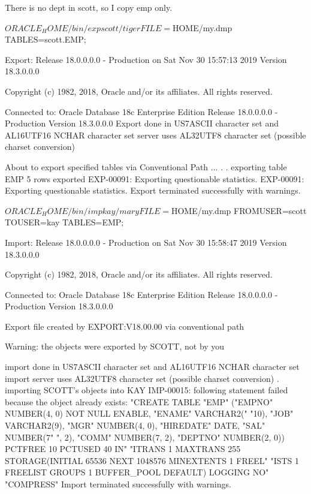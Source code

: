 \documentclass{article}
\begin{document}
There is no dept in scott, so I copy emp only.
\begin{commandshell}
$ORACLE_HOME/bin/exp scott/tiger FILE=$HOME/my.dmp TABLES=scott.EMP;
\end{commandshell}
\begin{messageshell}

Export: Release 18.0.0.0.0 - Production on Sat Nov 30 15:57:13 2019
Version 18.3.0.0.0

Copyright (c) 1982, 2018, Oracle and/or its affiliates.  All rights reserved.


Connected to: Oracle Database 18c Enterprise Edition Release 18.0.0.0.0 - Production
Version 18.3.0.0.0
Export done in US7ASCII character set and AL16UTF16 NCHAR character set
server uses AL32UTF8 character set (possible charset conversion)

About to export specified tables via Conventional Path ...
. . exporting table                            EMP          5 rows exported
EXP-00091: Exporting questionable statistics.
EXP-00091: Exporting questionable statistics.
Export terminated successfully with warnings.
\end{messageshell}
\begin{commandshell}
$ORACLE_HOME/bin/imp kay/mary FILE=$HOME/my.dmp  FROMUSER=scott TOUSER=kay TABLES=EMP;
\end{commandshell}
\begin{messageshell}

Import: Release 18.0.0.0.0 - Production on Sat Nov 30 15:58:47 2019
Version 18.3.0.0.0

Copyright (c) 1982, 2018, Oracle and/or its affiliates.  All rights reserved.


Connected to: Oracle Database 18c Enterprise Edition Release 18.0.0.0.0 - Production
Version 18.3.0.0.0

Export file created by EXPORT:V18.00.00 via conventional path

Warning: the objects were exported by SCOTT, not by you

import done in US7ASCII character set and AL16UTF16 NCHAR character set
import server uses AL32UTF8 character set (possible charset conversion)
. importing SCOTT's objects into KAY
IMP-00015: following statement failed because the object already exists:
 "CREATE TABLE "EMP" ("EMPNO" NUMBER(4, 0) NOT NULL ENABLE, "ENAME" VARCHAR2("
 "10), "JOB" VARCHAR2(9), "MGR" NUMBER(4, 0), "HIREDATE" DATE, "SAL" NUMBER(7"
 ", 2), "COMM" NUMBER(7, 2), "DEPTNO" NUMBER(2, 0))  PCTFREE 10 PCTUSED 40 IN"
 "ITRANS 1 MAXTRANS 255 STORAGE(INITIAL 65536 NEXT 1048576 MINEXTENTS 1 FREEL"
 "ISTS 1 FREELIST GROUPS 1 BUFFER_POOL DEFAULT)                    LOGGING NO"
 "COMPRESS"
Import terminated successfully with warnings.
\end{messageshell}
\end{document}
